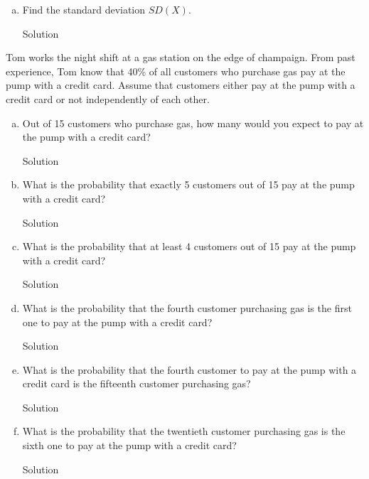 \documentclass{article}
\begin{document}
\begin{spacing}{1.1}
\begin{homeworkProblem}
\begin{enumerate}[(a)]
\begin{homeworkSection}{Solution}
			\end{homeworkSection}
		\item  Find the standard deviation $SD(X)$.
			\begin{homeworkSection}{Solution}
		
			\end{homeworkSection}
	\end{enumerate}
\end{homeworkProblem}
\begin{homeworkProblem}
	Tom works the night shift at a gas station on the edge of champaign.  From past experience, Tom know that 40\% of all customers who purchase gas pay at the pump with a credit card.  Assume that customers either pay at the pump with a credit card or not independently of each other. 
	\begin{enumerate}[(a)]
		\item Out of 15 customers who purchase gas, how many would you expect to pay at the pump with a credit card?
			\begin{homeworkSection}{Solution}
		
			\end{homeworkSection}
		\item What is the probability that exactly 5 customers out of 15 pay at the pump with a credit card?
			\begin{homeworkSection}{Solution}
		
			\end{homeworkSection}
		\item  What is the probability that at least 4 customers out of 15 pay at the pump with a credit card?
			\begin{homeworkSection}{Solution}
		
			\end{homeworkSection}
		\item What is the probability that the fourth customer purchasing gas is the first one to pay at the pump with a credit card?
			\begin{homeworkSection}{Solution}
		
			\end{homeworkSection}
		\item What is the probability that the fourth customer to pay at the pump with a credit card is the fifteenth customer purchasing gas?
			\begin{homeworkSection}{Solution}
		
			\end{homeworkSection}	
		\item What is the probability that the twentieth customer purchasing gas is the sixth one to pay at the pump with a credit card?		
			\begin{homeworkSection}{Solution}
		

\end{homeworkSection}
\end{enumerate}
\end{homeworkProblem}
\end{spacing}
\end{document}
